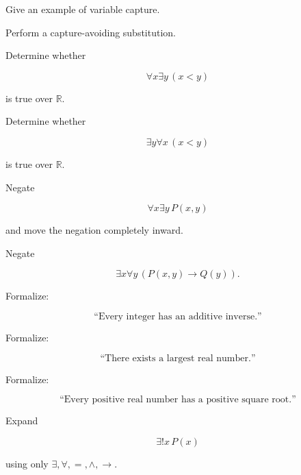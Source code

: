 \begin{exercise}[3]
Give an example of variable capture.
\end{exercise}

\begin{exercise}[3]
Perform a capture-avoiding substitution.
\end{exercise}

\begin{exercise}[2]
Determine whether

\[
\forall x\exists y\,(x<y)
\]

is true over \(\mathbb{R}\).
\end{exercise}

\begin{exercise}[2]
Determine whether

\[
\exists y\forall x\,(x<y)
\]

is true over \(\mathbb{R}\).
\end{exercise}

\begin{exercise}[3]
Negate

\[
\forall x\exists y\,P(x,y)
\]

and move the negation completely inward.
\end{exercise}

\begin{exercise}[3]
Negate

\[
\exists x
\forall y
\,
(P(x,y)\rightarrow Q(y)).
\]
\end{exercise}

\begin{exercise}[2]
Formalize:

\[
\text{``Every integer has an additive inverse.''}
\]
\end{exercise}

\begin{exercise}[2]
Formalize:

\[
\text{``There exists a largest real number.''}
\]
\end{exercise}

\begin{exercise}[3]
Formalize:

\[
\text{``Every positive real number has a positive square root.''}
\]
\end{exercise}

\begin{exercise}[3]
Expand

\[
\exists!x\,P(x)
\]

using only \(\exists,\forall,=,\land,\rightarrow\).
\end{exercise}

